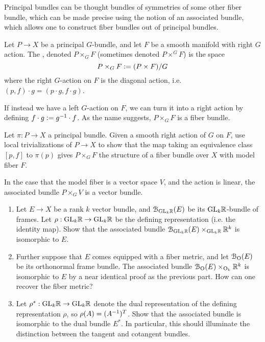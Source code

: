 Principal bundles can be thought bundles of symmetries of some other fiber bundle,
which can be made precise using the notion of an associated bundle, which allows
one to construct fiber bundles out of principal bundles.
%
\begin{defn}
Let $P \to X$ be a principal $G$-bundle, and let $F$ be a smooth manifold with
right $G$ action. The , denoted $P \times_G F$
(sometimes denoted $P \times^G F$) is the space
\[
P \times_G F \vcentcolon= (P \times F)/G
\]
where the right $G$-action on $F$ is the diagonal action, i.e.
$(p,f)\cdot g = (p\cdot g, f\cdot g)$.
\end{defn}
%
If instead we have a left $G$-action on $F$, we can turn it into a right action
by defining $f \cdot g \vcentcolon= g^{-1} \cdot f$. As the name suggests, $P \times_G F$ is
a fiber bundle.
%
\begin{exer}
Let $\pi : P \to X$ a principal bundle. Given a smooth right action of $G$ on
$F$, use local trivializations of $P \to X$ to show that the map taking an
equivalence class $[p,f]$ to $\pi(p)$ gives $P\times_G F$ the structure of a fiber
bundle over $X$ with model fiber $F$.
\end{exer}
%
In the case that the model fiber is a vector space $V$, and the action is
linear, the associated bundle $P \times_G V$ is a vector bundle.
%
\begin{exer} \enumbreak
\begin{enumerate}
  \item Let $E \to X$ be a rank $k$ vector bundle, and $\mathcal{B}_{\mathrm{GL}_k\mathbb{R}}(E)$ be its
  $\mathrm{GL}_k\mathbb{R}$-bundle of frames. Let $\rho : \mathrm{GL}_k\mathbb{R} \to \mathrm{GL}_k\mathbb{R}$ be the
  defining representation (i.e. the identity map). Show that the associated bundle
  $\mathcal{B}_{\mathrm{GL}_k\mathbb{R}}(E) \times_{\mathrm{GL}_k\mathbb{R}} \mathbb{R}^k$ is isomorphic to $E$.
  \item Further suppose that $E$ comes equipped with a fiber metric, and let
  $\mathcal{B}_{\mathrm{O}}(E)$  be its orthonormal frame bundle. The associated
  bundle $\mathcal{B}_{\mathrm{O}}(E) \times_{\mathrm{O}_k} \mathbb{R}^k$ is isomorphic to $E$
  by a near identical proof as the previous part. How can one recover the fiber
  metric?
  \item Let $\rho^* : \mathrm{GL}_k\mathbb{R} \to \mathrm{GL}_k\mathbb{R}$ denote the dual representation of the
  defining representation $\rho$, so $\rho(A) = (A^{-1})^T$. Show that the associated
  bundle is isomorphic to the dual bundle $E^*$. In particular, this should
  illuminate the distinction between the tangent and cotangent bundles.
\end{enumerate}
\end{exer}
